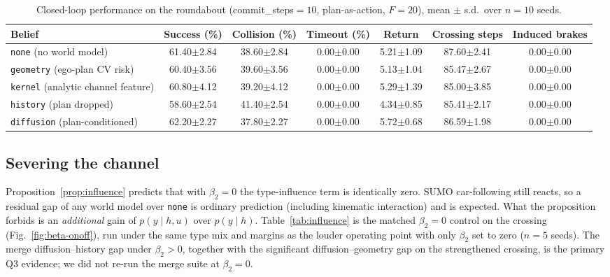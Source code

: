 \documentclass[conference]{IEEEtran}
\begin{document}
\begin{table}[!t]
\caption{Closed-loop performance on the roundabout (commit\_steps$=10$, plan-as-action, $F=20$), mean $\pm$ s.d.\ over $n{=}10$ seeds.}
\label{tab:roundabout}
\centering
\begin{tabular}{|l|c|c|c|c|c|c|}
\hline
\textbf{Belief} & \textbf{Success (\%)} & \textbf{Collision (\%)} & \textbf{Timeout (\%)} & \textbf{Return} & \textbf{Crossing steps} & \textbf{Induced brakes} \\
\hline
\texttt{none} (no world model) & 61.40$\pm$2.84 & 38.60$\pm$2.84 & 0.00$\pm$0.00 & 5.21$\pm$1.09 & 87.60$\pm$2.41 & 0.00$\pm$0.00 \\ %
\texttt{geometry} (ego-plan CV risk) & 60.40$\pm$3.56 & 39.60$\pm$3.56 & 0.00$\pm$0.00 & 5.13$\pm$1.04 & 85.47$\pm$2.67 & 0.00$\pm$0.00 \\ %
\texttt{kernel} (analytic channel feature) & 60.80$\pm$4.12 & 39.20$\pm$4.12 & 0.00$\pm$0.00 & 5.29$\pm$1.39 & 85.00$\pm$3.85 & 0.00$\pm$0.00 \\ %
\texttt{history} (plan dropped) & 58.60$\pm$2.54 & 41.40$\pm$2.54 & 0.00$\pm$0.00 & 4.34$\pm$0.85 & 85.41$\pm$2.17 & 0.00$\pm$0.00 \\ %
\texttt{diffusion} (plan-conditioned) & 62.20$\pm$2.27 & 37.80$\pm$2.27 & 0.00$\pm$0.00 & 5.72$\pm$0.68 & 86.59$\pm$1.98 & 0.00$\pm$0.00 \\ %
\hline
\end{tabular}
\end{table}


\subsection{Severing the channel}
\label{sec:exp:influence}

Proposition~\ref{prop:influence} predicts that with $\beta_2 = 0$ the
type-influence term is identically zero. SUMO car-following still reacts, so a
residual gap of any world model over \texttt{none} is ordinary prediction
(including kinematic interaction) and is expected. What the proposition forbids
is an \emph{additional} gain of $p(y\mid h,u)$ over $p(y\mid h)$.
Table~\ref{tab:influence} is the matched $\beta_2=0$ control on the crossing
(Fig.~\ref{fig:beta-onoff}), run under the same type mix and margins as the
louder operating point with only $\beta_2$ set to zero ($n{=}5$ seeds).
The merge diffusion--history gap under $\beta_2>0$, together with the
significant diffusion--geometry gap on the strengthened crossing, is the
primary Q3 evidence; we did not re-run the merge suite at $\beta_2=0$.
\end{document}

